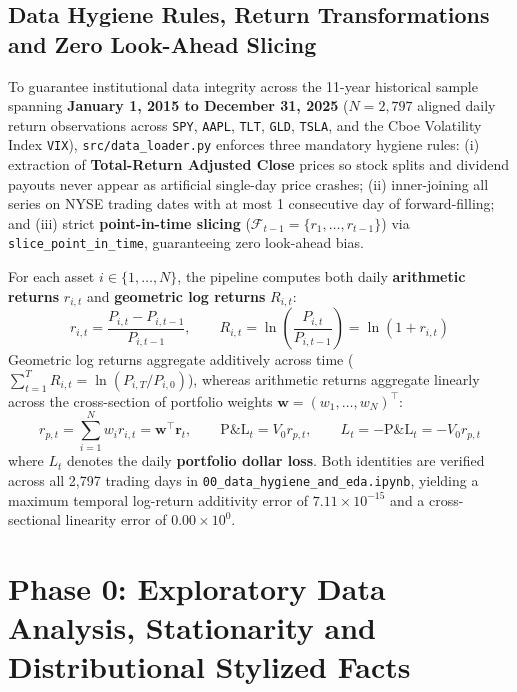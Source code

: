\documentclass[11pt,a4paper]{article}
\begin{document}
\subsection{Data Hygiene Rules, Return Transformations and Zero Look-Ahead Slicing}

To guarantee institutional data integrity across the 11-year historical sample spanning \textbf{January 1, 2015 to December 31, 2025} ($N = 2,797$ aligned daily return observations across \texttt{SPY}, \texttt{AAPL}, \texttt{TLT}, \texttt{GLD}, \texttt{TSLA}, and the Cboe Volatility Index \texttt{VIX}), \texttt{src/data\_loader.py} enforces three mandatory hygiene rules: (i) extraction of \textbf{Total-Return Adjusted Close} prices so stock splits and dividend payouts never appear as artificial single-day price crashes; (ii) inner-joining all series on NYSE trading dates with at most 1 consecutive day of forward-filling; and (iii) strict \textbf{point-in-time slicing} ($\mathcal{F}_{t-1} = \{r_1, \dots, r_{t-1}\}$) via \texttt{slice\_point\_in\_time}, guaranteeing zero look-ahead bias.

For each asset $i \in \{1, \dots, N\}$, the pipeline computes both daily \textbf{arithmetic returns} $r_{i,t}$ and \textbf{geometric log returns} $R_{i,t}$:
\begin{equation}
r_{i,t} = \frac{P_{i,t} - P_{i,t-1}}{P_{i,t-1}}, \qquad R_{i,t} = \ln\left(\frac{P_{i,t}}{P_{i,t-1}}\right) = \ln(1 + r_{i,t})
\end{equation}
Geometric log returns aggregate additively across time ($\sum_{t=1}^T R_{i,t} = \ln(P_{i,T}/P_{i,0})$), whereas arithmetic returns aggregate linearly across the cross-section of portfolio weights $\mathbf{w} = (w_1, \dots, w_N)^\top$:
\begin{equation}
r_{p,t} = \sum_{i=1}^{N} w_i r_{i,t} = \mathbf{w}^\top \mathbf{r}_t, \qquad \text{P\&L}_t = V_0 r_{p,t}, \qquad L_t = -\text{P\&L}_t = -V_0 r_{p,t}
\end{equation}
where $L_t$ denotes the daily \textbf{portfolio dollar loss}. Both identities are verified across all 2,797 trading days in \texttt{00\_data\_hygiene\_and\_eda.ipynb}, yielding a maximum temporal log-return additivity error of $7.11 \times 10^{-15}$ and a cross-sectional linearity error of $0.00 \times 10^0$.

\section{Phase 0: Exploratory Data Analysis, Stationarity and Distributional Stylized Facts}
\end{document}
